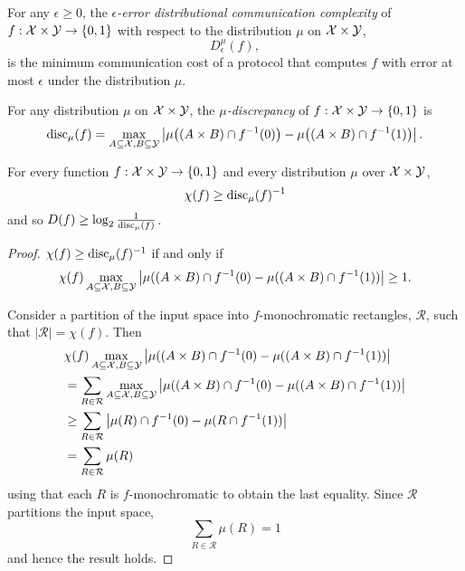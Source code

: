 \begin{definition}
For any $\epsilon \ge 0$, the \emph{$\epsilon$-error distributional communication complexity} of $f : \mathcal{X} \times \mathcal{Y} \to \{0,1\}$ with respect to the distribution $\mu$ on $\mathcal{X} \times \mathcal{Y}$,
\[
D_\epsilon^{\mu}(f),
\]
is the minimum communication cost of a protocol that computes $f$ with error at most $\epsilon$ under the distribution $\mu$.
\end{definition}

\begin{definition}[$\mu$-Discrepancy]
For any distribution $\mu$ on $\mathcal{X} \times \mathcal{Y}$, 
the \emph{$\mu$-discrepancy} of $f : \mathcal{X} \times \mathcal{Y} \to \{0,1\}$ is
\[
\mathrm{disc}_\mu(f) = \max_{A \subseteq \mathcal{X}, B \subseteq \mathcal{Y}} 
\left| \mu\big( (A \times B) \cap f^{-1}(0) \big) - \mu\big( (A \times B) \cap f^{-1}(1)\big) \right|.
\]
\end{definition}

\begin{theorem}
For every function $f : \mathcal{X} \times \mathcal{Y} \to \{0,1\}$ and every distribution $\mu$ over $\mathcal{X} \times \mathcal{Y}$, 
\[
\chi(f) \ge \mathrm{disc}_\mu(f)^{-1}
\] 
and so $D(f) \ge \log_2 \frac1{\mathrm{disc}_\mu(f)}$.
\end{theorem}

\begin{proof}
	
$\chi(f) \geq \mathrm{disc}_\mu(f)^{-1}$ if and only if
$$\chi(f)\max_{A \subseteq \mathcal{X}, B \subseteq \mathcal{Y}}\left|\mu((A\times B)\cap f^{-1}(0) -\mu((A\times B)\cap f^{-1}(1)) \right| \geq 1.$$

Consider a partition of the input space into $f$-monochromatic rectangles, $\mathcal R$, such that $|\mathcal R| = \chi(f)$. Then
\begin{align*}
&\chi(f)\max_{A \subseteq \mathcal{X}, B \subseteq \mathcal{Y}}\left|\mu((A\times B)\cap f^{-1}(0) -\mu((A\times B)\cap f^{-1}(1)) \right| \\
& = \sum_{R\in \mathcal R}\max_{A \subseteq \mathcal{X}, B \subseteq \mathcal{Y}}\left|\mu((A\times B)\cap f^{-1}(0) -\mu((A\times B)\cap f^{-1}(1)) \right|\\ 
&\geq \sum_{R \in \mathcal{R}}\left|\mu(R)\cap f^{-1}(0) -\mu(R\cap f^{-1}(1)) \right|\\ 
&= \sum_{R \in \mathcal{R}} \mu(R)
\end{align*}
using that each $R$ is $f$-monochromatic to obtain the last equality. Since $\mathcal R$ partitions the input space,
$$\sum_{R \in \mathcal R} \mu(R)=1$$
and hence the result holds.
\end{proof}

